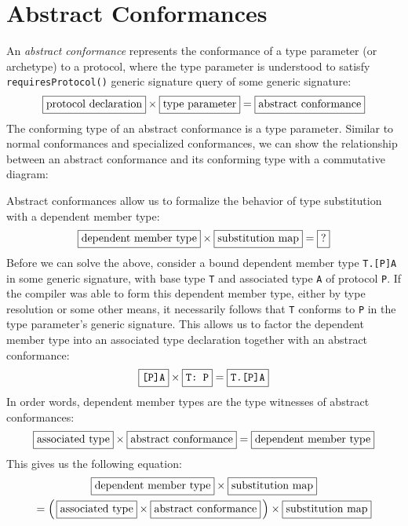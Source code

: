 \documentclass[a4paper,headsepline,bibliography=totoc,toc=flat,fleqn,twoside=semi]{scrbook}
\theoremstyle{definition}
\theoremstyle{definition}
\theoremstyle{definition}
\newcommand{\mathboxed}[1]{\boxed{\mbox{\vphantom{pI\texttt{pI}}#1}}}
\newcommand{\ttbox}[1]{\boxed{\mbox{\vphantom{pI\texttt{pI}}\texttt{#1}}}}
\begin{document}
\section{Abstract Conformances}\label{abstract conformances}
An \emph{abstract conformance} represents the conformance of a type parameter (or archetype) to a protocol, where the type parameter is understood to satisfy \texttt{requiresProtocol()} generic signature query of some generic signature:
\[
\mathboxed{protocol declaration} \times \mathboxed{type parameter} = \mathboxed{abstract conformance}
\]
The conforming type of an abstract conformance is a type parameter. Similar to normal conformances and specialized conformances, we can show the relationship between an abstract conformance and its conforming type with a commutative diagram:
\begin{quote}
\end{quote}
Abstract conformances allow us to formalize the behavior of type substitution with a dependent member type:
\[
\mathboxed{dependent member type} \times \mathboxed{substitution map} = \mathboxed{?}
\]
Before we can solve the above, consider a bound dependent member type \texttt{T.[P]A} in some generic signature, with base type \texttt{T} and associated type \texttt{A} of protocol \texttt{P}. If the compiler was able to form this dependent member type, either by type resolution or some other means, it necessarily follows that \texttt{T} conforms to \texttt{P} in the type parameter's generic signature. This allows us to factor the dependent member type into an associated type declaration together with an abstract conformance:
\[
\ttbox{[P]A} \times \ttbox{T:\ P} = \ttbox{T.[P]A}
\]
In order words, dependent member types are the type witnesses of abstract conformances:
\[
\mathboxed{associated type} \times \mathboxed{abstract conformance} = \mathboxed{dependent member type}
\]
This gives us the following equation:
\begin{gather*}
\mathboxed{dependent member type} \times \mathboxed{substitution map}\\
= \left(\,\mathboxed{associated type} \times \mathboxed{abstract conformance} \,\right) \times \mathboxed{substitution map}
\end{gather*}
\end{document}
